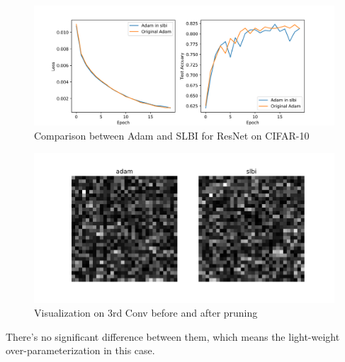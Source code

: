 \documentclass[a4paper, 11pt]{article} %
\begin{document}
\begin{figure}[H]
	\centering
	\includegraphics[width=1.0\textwidth]{./img/train-adam-slbi.png}
	\caption{Comparison between Adam and SLBI for ResNet on CIFAR-10}
\end{figure}

\begin{figure}[H]
	\centering
	\includegraphics[width=1.0\textwidth]{./img/conv-adam-slbi.png}
	\caption{Visualization on 3rd Conv before and after pruning}
\end{figure}

There's no significant difference between them, which means the light-weight
over-parameterization in this case.

\bigskip



\end{document}
